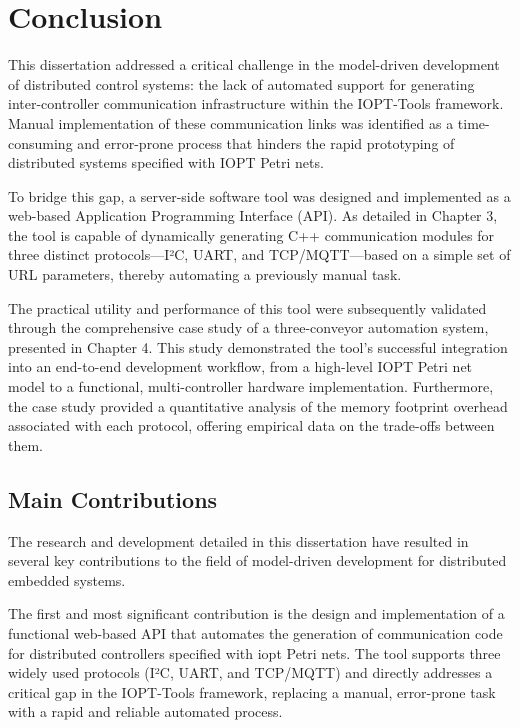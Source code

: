 
%

\chapter{Conclusion}
\label{cha:conclusion}

This dissertation addressed a critical challenge in the model-driven development of distributed control systems: the lack of automated support for generating inter-controller communication infrastructure within the IOPT-Tools framework. Manual implementation of these communication links was identified as a time-consuming and error-prone process that hinders the rapid prototyping of distributed systems specified with IOPT Petri nets.

To bridge this gap, a server-side software tool was designed and implemented as a web-based Application Programming Interface (API). As detailed in Chapter 3, the tool is capable of dynamically generating C++ communication modules for three distinct protocols—I²C, UART, and TCP/MQTT—based on a simple set of URL parameters, thereby automating a previously manual task.

The practical utility and performance of this tool were subsequently validated through the comprehensive case study of a three-conveyor automation system, presented in Chapter 4. This study demonstrated the tool's successful integration into an end-to-end development workflow, from a high-level IOPT Petri net model to a functional, multi-controller hardware implementation. Furthermore, the case study provided a quantitative analysis of the memory footprint overhead associated with each protocol, offering empirical data on the trade-offs between them.


\section{Main Contributions}
\label{sec:main_contributions}

The research and development detailed in this dissertation have resulted in several key contributions to the field of model-driven development for distributed embedded systems. 

The first and most significant contribution is the design and implementation of a functional web-based API that automates the generation of communication code for distributed controllers specified with \gls{iopt} Petri nets. The tool supports three widely used protocols (I²C, UART, and TCP/MQTT) and directly addresses a critical gap in the IOPT-Tools framework, replacing a manual, error-prone task with a rapid and reliable automated process.

